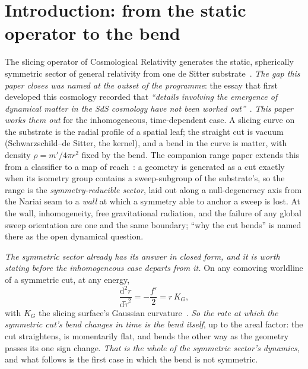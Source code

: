 \documentclass[11pt,a4paper]{article}
\theoremstyle{plain}
\theoremstyle{definition}
\theoremstyle{remark}
\begin{document}
\begin{abstract}
\emph{At the wall we settle two questions.} The dynamics continues across it; and the wall is \emph{not} a metric singularity in the precise sense the causality paper defines---no measure collapses there---so it is a regular radiative boundary rather than a place at which a clock could be re-founded. In the nonlinear $\Lambda>0$ regime the de~Sitter background is an attractor and the first-class system is consistent to all orders, so the continuous dynamics \emph{admits} rather than forces a quantum structure. We close with what is not claimed: no closed-form nonlinear solution, and no non-perturbative quantization of the interacting tower.
\end{abstract}

\section{Introduction: from the static operator to the bend}\label{sec:intro}

The slicing operator of Cosmological Relativity generates the static, spherically symmetric sector of general relativity from one de Sitter substrate~\cite{JanzenOperator}. \emph{The gap this paper closes was named at the outset of the programme}: the essay that first developed this cosmology recorded that \emph{``details involving the emergence of dynamical matter in the SdS cosmology have not been worked out''}~\cite{JanzenFQXi2012}. \emph{This paper works them out} for the inhomogeneous, time-dependent case. A slicing curve on the substrate is the radial profile of a spatial leaf; the straight cut is vacuum (Schwarzschild--de Sitter, the kernel), and a bend in the curve is matter, with density $\rho=m'/4\pi r^2$ fixed by the bend. The companion range paper extends this from a classifier to a map of reach~\cite{JanzenRange}: a geometry is generated as a cut exactly when its isometry group contains a sweep-subgroup of the substrate's, so the range is the \emph{symmetry-reducible sector}, laid out along a null-degeneracy axis from the Nariai seam to a \emph{wall} at which a symmetry able to anchor a sweep is lost. At the wall, inhomogeneity, free gravitational radiation, and the failure of any global sweep orientation are one and the same boundary; ``why the cut bends'' is named there as the open dynamical question.

\emph{The symmetric sector already has its answer in closed form, and it is worth stating before the inhomogeneous case departs from it.} On any comoving worldline of a symmetric cut, at any energy,
\begin{equation}\label{eq:symmetric-dynamics}
  \frac{\mathrm{d}^{2}r}{\mathrm{d}\tilde\tau^{2}}=-\frac{f'}{2}=r\,K_{G},
\end{equation}
with $K_{G}$ the slicing surface's Gaussian curvature~\cite{JanzenSlicing}. \emph{So the rate at which the symmetric cut's bend changes in time is the bend itself}, up to the areal factor: the cut straightens, is momentarily flat, and bends the other way as the geometry passes its one sign change. \emph{That is the whole of the symmetric sector's dynamics}, and what follows is the first case in which the bend is not symmetric.
\end{document}
